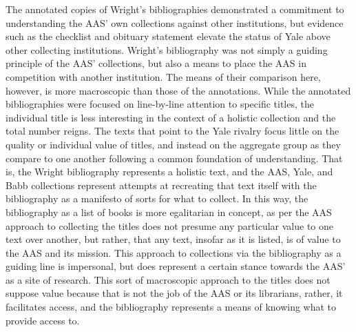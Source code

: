 The annotated copies of Wright's bibliographies demonstrated a commitment to understanding the AAS' own collections against other institutions, but evidence such as the checklist and obituary statement elevate the status of Yale above other collecting institutions. Wright's bibliography was not simply a guiding principle of the AAS' collections, but also a means to place the AAS in competition with another institution. The means of their comparison here, however, is more macroscopic than those of the annotations. While the annotated bibliographies were focused on line-by-line attention to specific titles, the individual title is less interesting in the context of a holistic collection and the total number reigns. The texts that point to the Yale rivalry focus little on the quality or individual value of titles, and instead on the aggregate group as they compare to one another following a common foundation of understanding. That is, the Wright bibliography represents a holistic text, and the AAS, Yale, and Babb collections represent attempts at recreating that text itself with the bibliography as a manifesto of sorts for what to collect. In this way, the bibliography as a list of books is more egalitarian in concept, as per the AAS approach to collecting the titles does not presume any particular value to one text over another, but rather, that any text, insofar as it is listed, is of value to the AAS and its mission. This approach to collections via the bibliography as a guiding line is impersonal, but does represent a certain stance towards the AAS' as a site of research. This sort of macroscopic approach to the titles does not suppose value because that is not the job of the AAS or its librarians, rather, it facilitates access, and the bibliography represents a means of knowing what to provide access to.

